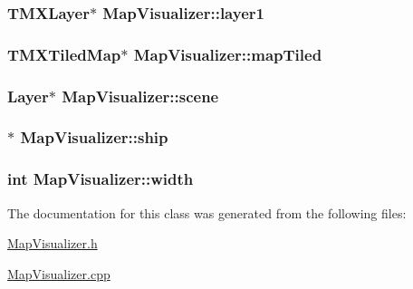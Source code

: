 \hypertarget{classMapVisualizer_acb9dfe2f29396a1938df1303612b6704}{
\subsubsection[{layer1}]{\setlength{\rightskip}{0pt plus 5cm}T\-M\-X\-Layer$\ast$ Map\-Visualizer\-::layer1}}\label{classMapVisualizer_acb9dfe2f29396a1938df1303612b6704}
\hypertarget{classMapVisualizer_a8178bb6206e1d4f7eded58480e43d92c}{
\subsubsection[{map\-Tiled}]{\setlength{\rightskip}{0pt plus 5cm}T\-M\-X\-Tiled\-Map$\ast$ Map\-Visualizer\-::map\-Tiled}}\label{classMapVisualizer_a8178bb6206e1d4f7eded58480e43d92c}
\hypertarget{classMapVisualizer_a7fde95f09d1c8ef52b79e6d65d7c0b0c}{
\subsubsection[{scene}]{\setlength{\rightskip}{0pt plus 5cm}Layer$\ast$ Map\-Visualizer\-::scene}}\label{classMapVisualizer_a7fde95f09d1c8ef52b79e6d65d7c0b0c}
\hypertarget{classMapVisualizer_aae41754a661628c88a957589e48b7b9e}{
\subsubsection[{ship}]{$\ast$ Map\-Visualizer\-::ship}}\label{classMapVisualizer_aae41754a661628c88a957589e48b7b9e}
\hypertarget{classMapVisualizer_a6e43275dd163342cea857a167c030279}{
\subsubsection[{width}]{\setlength{\rightskip}{0pt plus 5cm}int Map\-Visualizer\-::width}}\label{classMapVisualizer_a6e43275dd163342cea857a167c030279}


The documentation for this class was generated from the following files\-:\begin{DoxyCompactItemize}
\item 
\hyperlink{MapVisualizer_8h}{Map\-Visualizer.\-h}\item 
\hyperlink{MapVisualizer_8cpp}{Map\-Visualizer.\-cpp}\end{DoxyCompactItemize}
